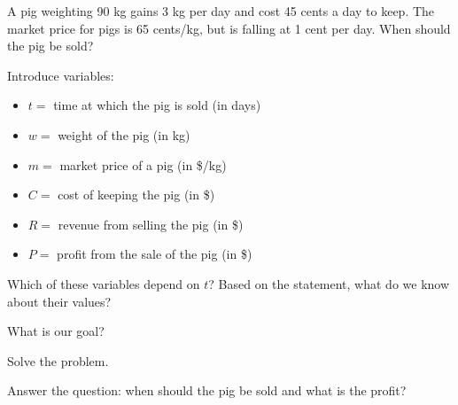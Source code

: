 \documentclass{workbook}
\begin{document}
\begin{slide}

\question

\begin{problem}
A pig weighting 90 kg gains 3 kg per day and cost 45 cents a day to keep. The market price for pigs is 65 cents/kg, but is falling at 1 cent per day. When should the pig be sold?	
\end{problem}

Introduce variables:
\begin{itemize}
	\item $t=$ time at which the pig is sold (in days)
	\item $w=$ weight of the pig (in kg)
	\item $m=$ market price of a pig (in \$/kg)
	\item $C=$ cost of keeping the pig (in \$)
	\item $R=$ revenue from selling the pig (in \$)
	\item $P=$ profit from the sale of the pig (in \$)
\end{itemize}
	

\begin{parts}
	\item Which of these variables depend on $t$? Based on the statement, what do we know about their values?
	\item What is our goal?
	\item Solve the problem.
	\item Answer the question: when should the pig be sold and what is the profit?
\end{parts}

\end{slide}
\end{document}
